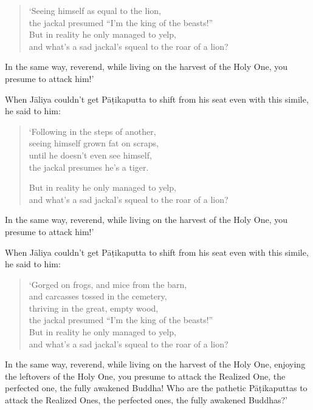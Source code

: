 \documentclass[12pt,openany]{book}%
\begin{document}
\begin{verse}%
‘Seeing himself as equal to the lion, \\
the jackal presumed “I’m the king of the beasts!” \\
But in reality he only managed to yelp, \\
and what’s a sad jackal’s squeal to the roar of a lion? 

%
\end{verse}

In the same way, reverend, while living on the harvest of the Holy One, you presume to attack him!’ 

When \textsanskrit{Jāliya} couldn’t get \textsanskrit{Pāṭikaputta} to shift from his seat even with this simile, he said to him: 

\begin{verse}%
‘Following in the steps of another, \\
seeing himself grown fat on scraps, \\
until he doesn’t even see himself, \\
the jackal presumes he’s a tiger. 

But in reality he only managed to yelp, \\
and what’s a sad jackal’s squeal to the roar of a lion? 

%
\end{verse}

In the same way, reverend, while living on the harvest of the Holy One, you presume to attack him!’ 

When \textsanskrit{Jāliya} couldn’t get \textsanskrit{Pāṭikaputta} to shift from his seat even with this simile, he said to him: 

\begin{verse}%
‘Gorged on frogs, and mice from the barn, \\
and carcasses tossed in the cemetery, \\
thriving in the great, empty wood, \\
the jackal presumed “I’m the king of the beasts!” \\
But in reality he only managed to yelp, \\
and what’s a sad jackal’s squeal to the roar of a lion? 

%
\end{verse}

In the same way, reverend, while living on the harvest of the Holy One, enjoying the leftovers of the Holy One, you presume to attack the Realized One, the perfected one, the fully awakened Buddha! Who are the pathetic \textsanskrit{Pāṭikaputtas} to attack the Realized Ones, the perfected ones, the fully awakened Buddhas?’ 
\end{document}
